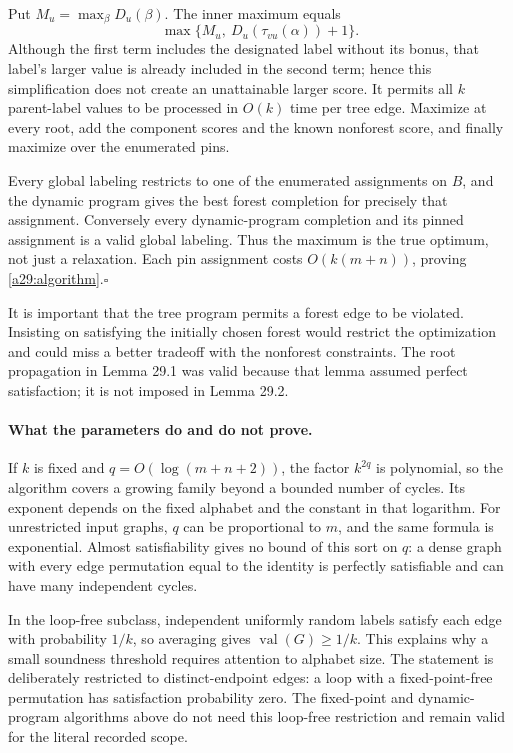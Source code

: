 \documentclass[11pt]{article}
\begin{document}
Put $M_u=\max_\beta D_u(\beta)$. The inner maximum equals
\[
                 \max\{M_u,\ D_u(\tau_{vu}(\alpha))+1\}.
\]
Although the first term includes the designated label without its bonus,
that label's larger value is already included in the second term; hence
this simplification does not create an unattainable larger score. It permits
all $k$ parent-label values to be processed in $O(k)$ time per tree edge.
Maximize at every root, add the component scores and the known nonforest
score, and finally maximize over the enumerated pins.

Every global labeling restricts to one of the enumerated assignments on
$B$, and the dynamic program gives the best forest completion for precisely
that assignment. Conversely every dynamic-program completion and its pinned
assignment is a valid global labeling. Thus the maximum is the true optimum,
not just a relaxation. Each pin assignment costs $O(k(m+n))$, proving
\eqref{a29:algorithm}.\hfill$\square$

It is important that the tree program permits a forest edge to be violated.
Insisting on satisfying the initially chosen forest would restrict the
optimization and could miss a better tradeoff with the nonforest constraints.
The root propagation in Lemma 29.1 was valid because that lemma assumed
perfect satisfaction; it is not imposed in Lemma 29.2.

\paragraph{What the parameters do and do not prove.}
If $k$ is fixed and $q=O(\log(m+n+2))$, the factor $k^{2q}$ is polynomial,
so the algorithm covers a growing family beyond a bounded number of cycles.
Its exponent depends on the fixed alphabet and the constant in that logarithm.
For unrestricted input graphs, $q$ can be proportional to $m$, and the same
formula is exponential. Almost satisfiability gives no bound of this sort
on $q$: a dense graph with every edge permutation equal to the identity is
perfectly satisfiable and can have many independent cycles.

In the loop-free subclass, independent uniformly random labels satisfy each
edge with probability $1/k$, so averaging gives $\operatorname{val}(G)\ge1/k$.
This explains why a small soundness threshold requires attention to alphabet
size. The statement is deliberately restricted to distinct-endpoint edges:
a loop with a fixed-point-free permutation has satisfaction probability zero.
The fixed-point and dynamic-program algorithms above do not need this
loop-free restriction and remain valid for the literal recorded scope.
\end{document}
